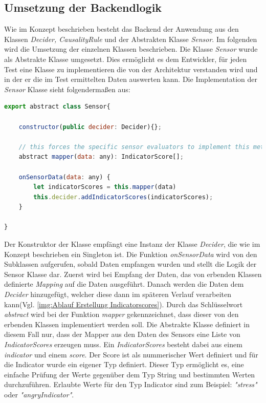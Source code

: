 \subsection{Umsetzung der Backendlogik}
Wie im Konzept beschrieben besteht das Backend der Anwendung aus den Klassen \textit{Decider, CausalityRule} und der Abstrakten Klasse \textit{Sensor}. Im folgenden wird die Umsetzung der einzelnen Klassen beschrieben.\newline
Die Klasse \textit{Sensor} wurde als Abstrakte Klasse umgesetzt. Dies ermöglicht es dem Entwickler, für jeden Test eine Klasse zu implementieren die von der Architektur verstanden wird und in der er die im Test ermittelten Daten auswerten kann. Die Implementation der \textit{Sensor} Klasse sieht folgendermaßen aus: 
\begin{lstlisting}[caption={abstrakte Klasse Sensor},language=JavaScript]
export abstract class Sensor{

	constructor(public decider: Decider){};

	// this forces the specific sensor evaluators to implement this method
	abstract mapper(data: any): IndicatorScore[]; 

	onSensorData(data: any) {
		let indicatorScores = this.mapper(data)
		this.decider.addIndicatorScores(indicatorScores);
	}

}
\end{lstlisting}
Der Konstruktor der Klasse empfängt eine Instanz der Klasse \textit{Decider}, die wie im Konzept beschrieben ein Singleton ist. Die Funktion \textit{onSensorData} wird von den Subklassen aufgerufen, sobald Daten empfangen wurden und stellt die Logik der Sensor Klasse dar. Zuerst wird bei Empfang der Daten, das von erbenden Klassen definierte \textit{Mapping} auf die Daten ausgeführt. Danach werden die Daten dem \textit{Decider} hinzugefügt, welcher diese dann im späteren Verlauf verarbeiten kann(Vgl. \ref{img:Ablauf Erstellung Indicatorscores}). Durch das Schlüsselwort \textit{abstract} wird bei der Funktion \textit{mapper} gekennzeichnet, dass dieser von den erbenden Klassen implementiert werden soll. Die Abstrakte Klasse definiert in diesem Fall nur, dass der Mapper aus den Daten des Sensors eine Liste von \textit{IndicatorScores} erzeugen muss. Ein \textit{IndicatorScores} besteht dabei aus einem \textit{indicator} und einem \textit{score}. Der Score ist als nummerischer Wert definiert und für die Indicator wurde ein eigener Typ definiert. Dieser Typ ermöglicht es, eine einfache Prüfung der Werte gegenüber dem Typ String und bestimmten Werten durchzuführen. Erlaubte Werte für den Typ Indicator sind zum Beispiel: \textit{"stress"} oder \textit{"angryIndicator"}.\newline
